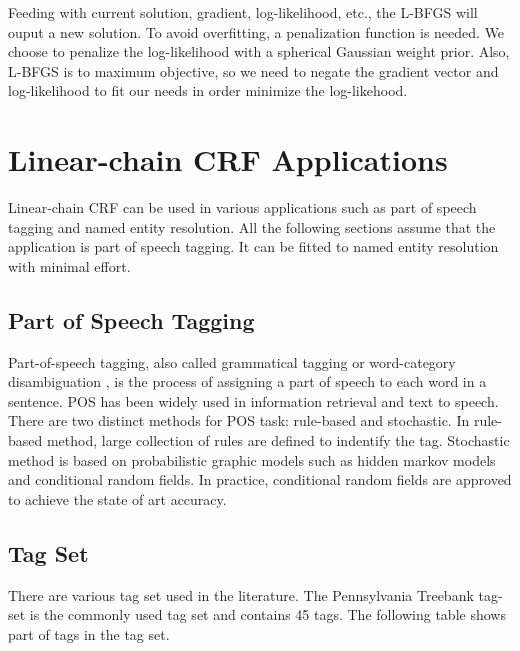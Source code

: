 Feeding with current solution, gradient, log-likelihood, etc., the L-BFGS will ouput a new solution.
To avoid overfitting, a penalization function is needed. We choose to penalize the log-likelihood with a spherical Gaussian weight prior.
Also, L-BFGS is to maximum objective, so we need to negate the gradient vector and log-likelihood to fit our needs in order minimize the log-likehood.

\section{Linear-chain CRF Applications}
Linear-chain CRF can be used in various applications such as  part of speech tagging and named entity resolution.
All the following sections assume that the application is part of speech tagging. It can be fitted to named entity resolution with minimal effort.

\subsection{Part of Speech Tagging}
Part-of-speech tagging, also called grammatical tagging or word-category disambiguation \cite{DBLP:journals/coling/DeRose88}, is the process of assigning
a part of speech to each word in a sentence. POS has been widely used in information retrieval and text to speech. There are two distinct methods for
POS task: rule-based and stochastic.
In rule-based method, large collection of rules are defined to indentify the tag. Stochastic method is based on probabilistic
graphic models such as hidden markov models and conditional random fields. In practice, conditional random fields are approved
to achieve the state of art accuracy.
\subsection{Tag Set}
There are various tag set used in the literature. The Pennsylvania Treebank tag-set \cite{DBLP:journals/coling/MarcusSM94} is the commonly used tag set and contains
45 tags. The following table shows part of tags in the tag set.

